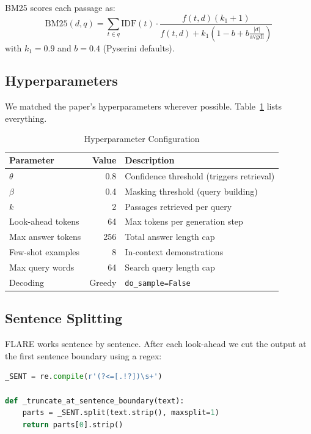 \documentclass[conference]{IEEEtran}
\begin{document}
BM25 scores each passage as:
\begin{equation}
  \text{BM25}(d,q) = \sum_{t \in q}
    \text{IDF}(t) \cdot
    \frac{f(t,d)(k_1+1)}{f(t,d)+k_1(1-b+b\frac{|d|}{\text{avgdl}})}
\end{equation}
with $k_1 = 0.9$ and $b = 0.4$ (Pyserini defaults).

\subsection{Hyperparameters}

We matched the paper's hyperparameters wherever possible.
Table~\ref{tab:hyperparams} lists everything.

\begin{table}[htbp]
\caption{Hyperparameter Configuration}
\label{tab:hyperparams}
\centering
\begin{tabular}{lrl}
\toprule
\textbf{Parameter} & \textbf{Value} & \textbf{Description} \\
\midrule
$\theta$ & 0.8  & Confidence threshold (triggers retrieval) \\
$\beta$  & 0.4  & Masking threshold (query building) \\
$k$      & 2    & Passages retrieved per query \\
Look-ahead tokens & 64 & Max tokens per generation step \\
Max answer tokens & 256 & Total answer length cap \\
Few-shot examples & 8  & In-context demonstrations \\
Max query words   & 64 & Search query length cap \\
Decoding          & Greedy & \texttt{do\_sample=False} \\
\bottomrule
\end{tabular}
\end{table}

\subsection{Sentence Splitting}

FLARE works sentence by sentence. After each look-ahead we cut the
output at the first sentence boundary using a regex:

\begin{lstlisting}[language=Python, caption={Sentence boundary detection}]
_SENT = re.compile(r'(?<=[.!?])\s+')

def _truncate_at_sentence_boundary(text):
    parts = _SENT.split(text.strip(), maxsplit=1)
    return parts[0].strip()
\end{lstlisting}
\end{document}
